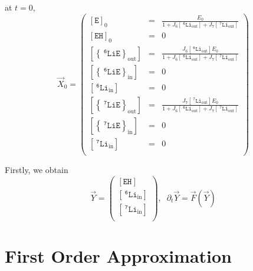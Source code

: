 \documentclass[aps,onecolumn,11pt]{revtex4}
\newcommand{\mychem}[1]{\mathtt{#1}}
\newcommand{\myconc}[1]{\left\lbrack{#1}\right\rbrack}
\newcommand{\spLi}[1]{{~^{\mychem{#1}}\mychem{Li}}}
\newcommand{\spEout}{\mychem{E}}
\newcommand{\Eout}{\myconc{\spEout}}
\newcommand{\spLiEin}[1]{\left\lbrace\spLi{#1}\spEout\right\rbrace_{\mathrm{in}}}
\newcommand{\LiEin}[1]{\myconc{\spLiEin{#1}}}
\newcommand{\spLiEout}[1]{\left\lbrace\spLi{#1}\spEout\right\rbrace_{\mathrm{out}}}
\newcommand{\LiEout}[1]{\myconc{\spLiEout{#1}}}
\newcommand{\spLiIn}[1]{{\spLi{#1}}_{\mathrm{in}}}
\newcommand{\LiIn}[1]{\myconc{\spLiIn{#1}}}
\newcommand{\spLiOut}[1]{{\spLi{#1}}_{\mathrm{out}}}
\newcommand{\LiOut}[1]{\myconc{\spLiOut{#1}}}
\newcommand{\spEHin}{\mychem{EH}}
\newcommand{\EHin}{\myconc{\spEHin}}
\begin{document}
at $t=0$,
\begin{equation}
	\vec{X}_0 = 
	\begin{pmatrix}
	\Eout_0    & = & \frac{E_0}{1+J_6 \LiOut{6} + J_7 \LiOut{7}}  \\
	\EHin_0    & = & 0 \\
	\LiEout{6} & = & \frac{J_6 \LiOut{6} E_0} {1+J_6 \LiOut{6} + J_7 \LiOut{7}} \\
	\LiEin{6}  & = & 0 \\
	\LiIn{6}   & = & 0 \\
	\LiEout{7} & = & \frac{J_7 \LiOut{7} E_0} {1+J_6 \LiOut{6} + J_7 \LiOut{7}}   \\
	\LiEin{7}  & = & 0 \\
	\LiIn{7}   & = & 0 \\
	\end{pmatrix}
\end{equation}

Firstly, we obtain
\begin{equation}
	\vec{Y} = 
	\begin{pmatrix}
	\EHin\\
	\LiIn{6}\\
	\LiIn{7}\\
	\end{pmatrix}
	,\;\;
	\partial_t \vec{Y} = \vec{F}\left(\vec{Y}\right) 
\end{equation}

\section{First Order Approximation}
\end{document}
